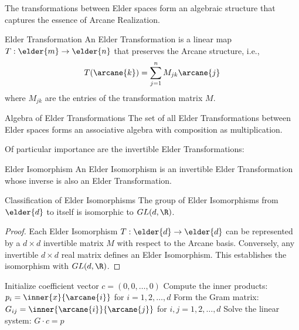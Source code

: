 \begin{twocolumnlayout}
The transformations between Elder spaces form an algebraic structure that captures the essence of Arcane Realization.

\begin{definition}{Elder Transformation}{}
An Elder Transformation is a linear map $T: \elder{m} \to \elder{n}$ that preserves the Arcane structure, i.e.,
\begin{equation}
T(\arcane{k}) = \sum_{j=1}^{n} M_{jk} \arcane{j}
\end{equation}
where $M_{jk}$ are the entries of the transformation matrix $M$.
\end{definition}

\begin{proposition}{Algebra of Elder Transformations}{}
The set of all Elder Transformations between Elder spaces forms an associative algebra with composition as multiplication.
\end{proposition}

Of particular importance are the invertible Elder Transformations:

\begin{definition}{Elder Isomorphism}{}
An Elder Isomorphism is an invertible Elder Transformation whose inverse is also an Elder Transformation.
\end{definition}

\begin{theorem}{Classification of Elder Isomorphisms}{}
The group of Elder Isomorphisms from $\elder{d}$ to itself is isomorphic to $GL(d, \R)$.
\end{theorem}

\begin{proof}
Each Elder Isomorphism $T: \elder{d} \to \elder{d}$ can be represented by a $d \times d$ invertible matrix $M$ with respect to the Arcane basis. Conversely, any invertible $d \times d$ real matrix defines an Elder Isomorphism. This establishes the isomorphism with $GL(d, \R)$.
\end{proof}

\begin{algorithm}[H]
\SetAlgoLined
\caption{Elder Decomposition Algorithm: Decomposition of an element into Arcane basis}
Initialize coefficient vector $c = (0, 0, \ldots, 0)$\;
Compute the inner products: $p_i = \inner{x}{\arcane{i}}$ for $i = 1, 2, \ldots, d$\;
Form the Gram matrix: $G_{ij} = \inner{\arcane{i}}{\arcane{j}}$ for $i, j = 1, 2, \ldots, d$\;
Solve the linear system: $G \cdot c = p$\;
\;
\end{algorithm}

\end{twocolumnlayout}

